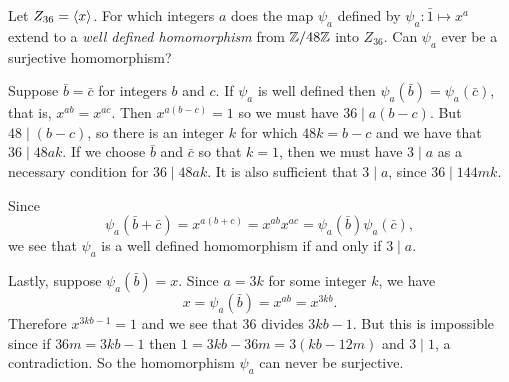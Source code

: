  Let $Z_{36} = \langle{x}\rangle$. For which integers $a$ does the map
$\psi_a$ defined by $\psi_a\colon\bar1\mapsto x^a$ extend to a {\em
  well defined homomorphism} from $\mathbb{Z}/48\mathbb{Z}$ into $Z_{36}$. Can
$\psi_a$ ever be a surjective homomorphism?
\begin{solution}
  Suppose $\bar{b} = \bar{c}$ for integers $b$ and $c$. If $\psi_a$ is
  well defined then $\psi_a(\bar{b}) = \psi_a(\bar{c})$, that is,
  $x^{ab} = x^{ac}$. Then $x^{a(b - c)} = 1$ so we must have
  $36\mid a(b-c)$. But $48\mid(b - c)$, so there is an integer $k$ for
  which $48k = b - c$ and we have that $36\mid48ak$. If we choose
  $\bar{b}$ and $\bar{c}$ so that $k = 1$, then we must have $3\mid a$
  as a necessary condition for $36\mid48ak$. It is also sufficient
  that $3\mid a$, since $36\mid144mk$.

  Since
  \begin{equation*}
    \psi_a(\bar{b} + \bar{c}) = x^{a(b + c)}
    = x^{ab}x^{ac} = \psi_a(\bar{b})\psi_a(\bar{c}),
  \end{equation*}
  we see that $\psi_a$ is a well defined homomorphism if and only if
  $3\mid a$.

  Lastly, suppose $\psi_a(\bar{b}) = x$. Since $a = 3k$ for some
  integer $k$, we have
  \begin{equation*}
    x = \psi_a(\bar{b}) = x^{ab} = x^{3kb}.
  \end{equation*}
  Therefore $x^{3kb - 1} = 1$ and we see that $36$ divides $3kb -
  1$. But this is impossible since if $36m = 3kb - 1$ then
  $1 = 3kb - 36m = 3(kb - 12m)$ and $3\mid1$, a contradiction. So the
  homomorphism $\psi_a$ can never be surjective.
\end{solution}
